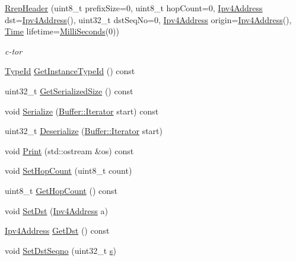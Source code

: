 \begin{DoxyCompactItemize}
\item 
\hyperlink{classns3_1_1aodv_1_1RrepHeader_aa05b7871285bac865f1ed0e84ccd21cd}{Rrep\+Header} (uint8\+\_\+t prefix\+Size=0, uint8\+\_\+t hop\+Count=0, \hyperlink{classns3_1_1Ipv4Address}{Ipv4\+Address} dst=\hyperlink{classns3_1_1Ipv4Address}{Ipv4\+Address}(), uint32\+\_\+t dst\+Seq\+No=0, \hyperlink{classns3_1_1Ipv4Address}{Ipv4\+Address} origin=\hyperlink{classns3_1_1Ipv4Address}{Ipv4\+Address}(), \hyperlink{classns3_1_1Time}{Time} lifetime=\hyperlink{group__timecivil_gaf26127cf4571146b83a92ee18679c7a9}{Milli\+Seconds}(0))
\begin{DoxyCompactList}\small\item\em c-\/tor \end{DoxyCompactList}\item 
\hyperlink{classns3_1_1TypeId}{Type\+Id} \hyperlink{classns3_1_1aodv_1_1RrepHeader_ad60d24bf0caff53d54c03cc49b08bde9}{Get\+Instance\+Type\+Id} () const 
\item 
uint32\+\_\+t \hyperlink{classns3_1_1aodv_1_1RrepHeader_a88d8828723a22e16501330acc1529bfe}{Get\+Serialized\+Size} () const 
\item 
void \hyperlink{classns3_1_1aodv_1_1RrepHeader_a594b0c627d8d7627629add46970cda9a}{Serialize} (\hyperlink{classns3_1_1Buffer_1_1Iterator}{Buffer\+::\+Iterator} start) const 
\item 
uint32\+\_\+t \hyperlink{classns3_1_1aodv_1_1RrepHeader_a04a25ec636230a30d39bff020569f129}{Deserialize} (\hyperlink{classns3_1_1Buffer_1_1Iterator}{Buffer\+::\+Iterator} start)
\item 
void \hyperlink{classns3_1_1aodv_1_1RrepHeader_ab0563d50f9a332d37e74d4f5b97d852e}{Print} (std\+::ostream \&os) const 
\item 
void \hyperlink{classns3_1_1aodv_1_1RrepHeader_a865eb1b07aa86fdc2cc09e277603c091}{Set\+Hop\+Count} (uint8\+\_\+t count)
\item 
uint8\+\_\+t \hyperlink{classns3_1_1aodv_1_1RrepHeader_a9c7a1c05c3f0aa450b7964eef895925f}{Get\+Hop\+Count} () const 
\item 
void \hyperlink{classns3_1_1aodv_1_1RrepHeader_aa9418a08448f67f3d8a720fd637dc751}{Set\+Dst} (\hyperlink{classns3_1_1Ipv4Address}{Ipv4\+Address} a)
\item 
\hyperlink{classns3_1_1Ipv4Address}{Ipv4\+Address} \hyperlink{classns3_1_1aodv_1_1RrepHeader_a3dadab49f3fd290a537c846c8c4c49e7}{Get\+Dst} () const 
\item 
void \hyperlink{classns3_1_1aodv_1_1RrepHeader_a4e75e00e918bb6436e9d3c925c2150e1}{Set\+Dst\+Seqno} (uint32\+\_\+t \hyperlink{generate__test__data__lte__sinr_8m_ad83eeb3a142285d1243a08c6b7026df8}{s})

\end{DoxyCompactItemize}
